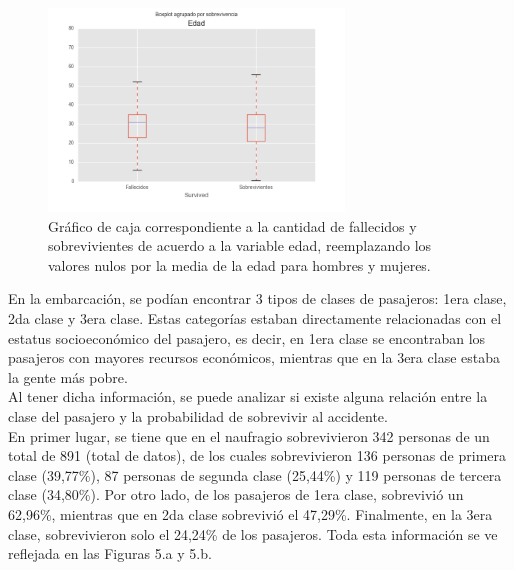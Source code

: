 \documentclass[letter, 10pt]{article}
\begin{document}
\begin{figure}[H]
\begin{center}
\includegraphics[width=0.7\textwidth]{Images/figure_5.png}
\caption{Gráfico de caja correspondiente a la cantidad de fallecidos y sobrevivientes de acuerdo a la variable edad, reemplazando los valores nulos por la media de la edad para hombres y mujeres.}
\end{center}
\end{figure}

En la embarcación, se podían encontrar 3 tipos de clases de pasajeros: 1era clase, 2da clase y 3era clase. Estas categorías estaban directamente relacionadas con el estatus socioeconómico del pasajero, es decir, en 1era clase se encontraban los pasajeros con mayores recursos económicos, mientras que en la 3era clase estaba la gente más pobre. \\

Al tener dicha información, se puede analizar si existe alguna relación entre la clase del pasajero y la probabilidad de sobrevivir al accidente.\\

En primer lugar, se tiene que en el naufragio sobrevivieron 342 personas de un total de 891 (total de datos), de los cuales sobrevivieron 136 personas de primera clase (39,77\%), 87 personas de segunda clase (25,44\%) y 119 personas de tercera clase (34,80\%). Por otro lado, de los pasajeros de 1era clase, sobrevivió un 62,96\%, mientras que en 2da clase sobrevivió el 47,29\%. Finalmente, en la 3era clase, sobrevivieron solo el 24,24\% de los pasajeros. Toda esta información se ve reflejada en las Figuras 5.a y 5.b.
\end{document}
